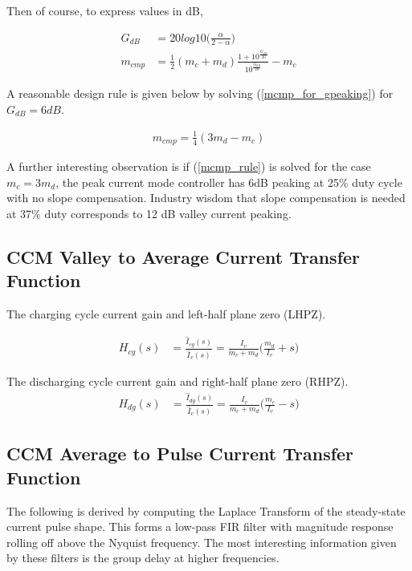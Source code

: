 \documentclass{scrartcl}
\begin{document}
		Then of course, to express values in dB,
		
		\begin{align}
		G_{dB} &= 20log10\bigg(\frac{\alpha}{2-\alpha}\bigg)\label{Gpeaking}\\
		m_{cmp} &= \frac{1}{2}(m_c + m_d) \frac{1 + 10^\frac{G_{dB}}{20}}{10^\frac{G_{dB}}{20}}  - m_c \label{mcmp_for_gpeaking}
		\end{align}
		
		A reasonable design rule is given below by solving (\ref{mcmp_for_gpeaking}) for $G_{dB} = 6 dB$.
		
		\begin{align}
			m_{cmp} = \frac{1}{4}(3m_d-m_c) \label{mcmp_rule}
		\end{align}
		
		A further interesting observation is if (\ref{mcmp_rule}) is solved for the case $m_c = 3m_d$, the peak current mode controller has 6dB peaking at 25$\%$ duty cycle with no slope compensation. Industry wisdom that slope compensation is needed at 37$\%$ duty corresponds to 12 dB valley current peaking.
		
		\subsection{CCM Valley to Average Current Transfer Function}
		The charging cycle current gain and left-half plane zero (LHPZ).

		\begin{align}
		H_{cg} (s) &= \frac{\hat{I}_{cg}(s)}{\hat{I}_{v}(s)} =\frac{I_{v}}{m_c + m_d}
		\big (\frac{m_d}{I_{v}} + s \big )
		\label{LHPZ_s_raw}
		\end{align}
		
		The discharging cycle current gain and right-half plane zero (RHPZ).
		\begin{align}
		H_{dg} (s) &= \frac{\hat{I}_{dg}(s)}{\hat{I}_{v}(s)} =\frac{I_{v}}{m_c + m_d}
		\big (\frac{m_c}{I_{v}} - s \big )
		\label{RHPZ_s_raw}
		\end{align}

		\subsection{CCM Average to Pulse Current Transfer Function}	
		The following is derived by computing the Laplace Transform of the steady-state current pulse shape.  This forms a low-pass FIR filter with magnitude response rolling off above the Nyquist frequency.  The most interesting information given by these filters is the group delay at higher frequencies.
		
\end{document}
